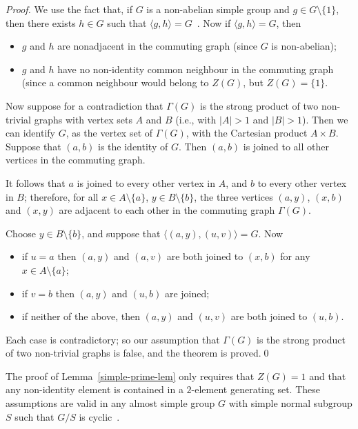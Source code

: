 \documentclass{elsarticle}
\begin{document}
\begin{proof}
We use the fact that, if $G$ is a non-abelian simple group and
$g\in G\setminus\{1\}$, then there exists $h\in G$ such that
$\langle g,h\rangle=G$~\cite{GK}. Now if $\langle g,h\rangle=G$, then
\begin{itemize}
\item $g$ and $h$ are nonadjacent in the commuting graph (since $G$
is non-abelian);
\item $g$ and $h$ have no non-identity common neighbour in the commuting
graph (since a common neighbour would belong to $Z(G)$, but $Z(G)=\{1\}$.
\end{itemize}

Now suppose for a contradiction that $\Gamma(G)$ is the strong product
of two non-trivial graphs with vertex sets $A$ and $B$ (i.e., with
$|A|>1$ and $|B|>1$). Then we can identify $G$, as the vertex set of
$\Gamma(G)$, with the Cartesian product $A\times B$. Suppose that
$(a,b)$ is the identity of $G$. Then $(a,b)$ is joined to all other
vertices in the commuting graph.

It follows that $a$ is joined to every other vertex in $A$, and $b$ to
every other vertex in $B$; therefore, for all $x\in A\setminus\{a\}$,
$y\in B\setminus\{b\}$, the three vertices $(a,y)$, $(x,b)$ and
$(x,y)$ are adjacent to each other in the commuting graph $\Gamma(G)$.

Choose $y\in B\setminus\{b\}$, and suppose that
$\langle(a,y),(u,v)\rangle=G$. Now
\begin{itemize}
\item if $u=a$ then $(a,y)$ and $(a,v)$ are both joined to $(x,b)$
for any $x\in A\setminus\{a\}$;
\item if $v=b$ then $(a,y)$ and $(u,b)$ are joined;
\item if neither of the above, then $(a,y)$ and $(u,v)$ are both
joined to $(u,b)$.
\end{itemize}
Each case is contradictory; so our assumption that $\Gamma(G)$ is the
strong product of two non-trivial graphs is false, and the theorem is
proved.\qed
\end{proof}

\begin{remark}
  The proof of Lemma~\ref{simple-prime-lem} only requires that
  $Z(G)=1$ and that any non-identity element is contained in a
  $2$-element generating set. These assumptions are valid in any
  almost simple group $G$ with simple normal subgroup $S$ such that
  $G/S$ is cyclic~\cite{BGH}.
\end{remark}
\end{document}
